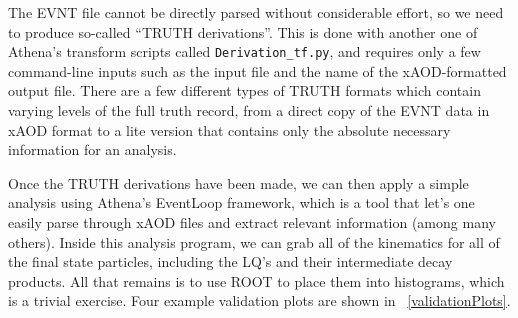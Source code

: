         The EVNT file cannot be directly parsed without considerable effort, so we need to produce so-called ``TRUTH derivations''. This is done with another one of Athena's transform scripts called \texttt{Derivation_tf.py}, and requires only a few command-line inputs such as the input file and the name of the xAOD-formatted output file. There are a few different types of TRUTH formats which contain varying levels of the full truth record, from a direct copy of the EVNT data in xAOD format to a lite version that contains only the absolute necessary information for an analysis.

        Once the TRUTH derivations have been made, we can then apply a simple analysis using Athena's EventLoop framework, which is a tool that let's one easily parse through xAOD files and extract relevant information (among many others). Inside this analysis program, we can grab all of the kinematics for all of the final state particles, including the LQ's and their intermediate decay products. All that remains is to use ROOT to place them into histograms, which is a trivial exercise. Four example validation plots are shown in ~\ref{validationPlots}.
        
